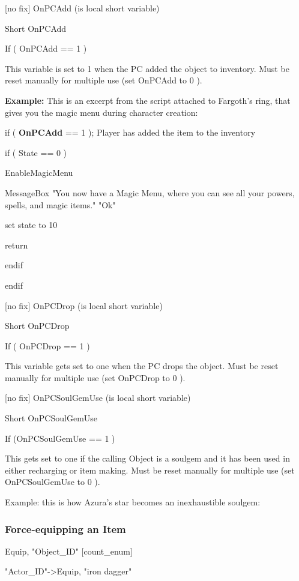 \documentclass[
]{article}
\begin{document}
{[}no fix{]} OnPCAdd (is local short variable)

Short OnPCAdd

If ( OnPCAdd == 1 )

This variable is set to 1 when the PC added the object to inventory.
Must be reset manually for multiple use (set OnPCAdd to 0 ).

\textbf{Example:} This is an excerpt from the script attached to
Fargoth's ring, that gives you the magic menu during character creation:

if ( \textbf{OnPCAdd} == 1 ); Player has added the item to the inventory

if ( State == 0 )

EnableMagicMenu

MessageBox "You now have a Magic Menu, where you can see all your
powers, spells, and magic items." "Ok"

set state to 10

return

endif

endif

{[}no fix{]} OnPCDrop (is local short variable)

Short OnPCDrop

If ( OnPCDrop == 1 )

This variable gets set to one when the PC drops the object. Must be
reset manually for multiple use (set OnPCDrop to 0 ).

{[}no fix{]} OnPCSoulGemUse (is local short variable)

Short OnPCSoulGemUse

If (OnPCSoulGemUse == 1 )

This gets set to one if the calling Object is a soulgem and it has been
used in either recharging or item making. Must be reset manually for
multiple use (set OnPCSoulGemUse to 0 ).

Example: this is how Azura's star becomes an inexhaustible soulgem:



\hypertarget{force-equipping-an-item}{%
\subsubsection{\texorpdfstring{\hfill\break
Force-equipping an Item
}{ Force-equipping an Item }}\label{force-equipping-an-item}}

Equip, "Object\_ID" {[}count\_enum{]}

"Actor\_ID"-\textgreater Equip, "iron dagger"
\end{document}
